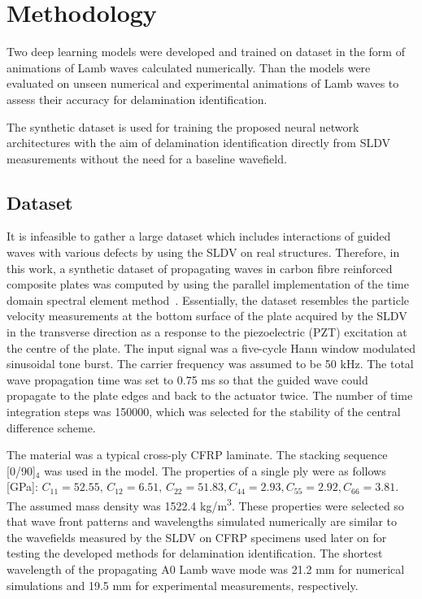 \section{Methodology}
\begin{sloppypar}
	Two deep learning models were developed and trained on dataset in the form of animations of Lamb waves calculated numerically. Than the models were evaluated on unseen numerical and experimental animations of Lamb waves to assess their accuracy for delamination identification.
	
	The synthetic dataset is used for training the proposed neural network architectures with the aim of delamination identification directly from SLDV measurements without the need for a baseline wavefield.
	\subsection{Dataset}
	It is infeasible to gather a large dataset which includes interactions of guided waves with various defects by using the SLDV on real structures. 
	Therefore, in this work, a synthetic dataset of propagating waves in carbon fibre reinforced composite plates was computed by using the parallel implementation of the time domain spectral element method~\cite{Kudela2020}. 
	Essentially, the dataset resembles the particle velocity measurements at the bottom surface of the plate acquired by the SLDV in the transverse direction as a response to the piezoelectric (PZT) excitation at the centre of the plate. 
	The input signal was a five-cycle Hann window modulated sinusoidal tone burst. The carrier frequency was assumed to be 50 kHz. 
	The total wave propagation time was set to 0.75 ms so that the guided wave could propagate to the plate edges and back to the actuator twice.
	The number of time integration steps was 150000, which was selected for the stability of the central difference scheme.
	
	The material was a typical cross-ply CFRP laminate. 
	The stacking sequence [0/90]\(_4\) was used in the model. 
	The properties of a single ply were as follows [GPa]:
	\(C_{11} = 52.55, \, C_{12} = 6.51, \, C_{22} = 51.83, C_{44} = 2.93, C_{55} = 2.92, C_{66} = 3.81\). 
	The assumed mass density was 1522.4 kg/m\textsuperscript{3}.
	These properties were selected so that wave front patterns and wavelengths simulated numerically are similar to the wavefields measured by the SLDV on CFRP specimens used later on for testing the developed methods for delamination identification.
	The shortest wavelength of the propagating A0 Lamb wave mode was 21.2 mm for numerical simulations and 19.5 mm for experimental measurements, respectively.
	

\end{sloppypar}
